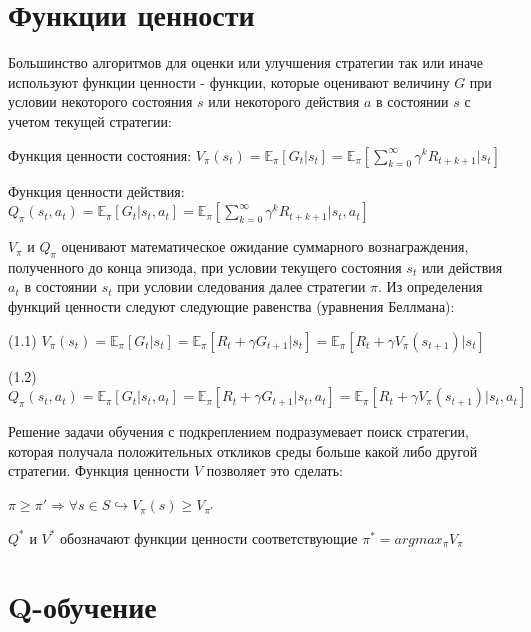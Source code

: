 \documentclass{mipt-thesis-bs}
\begin{document}
\section{Функции ценности}

Большинство алгоритмов для оценки или улучшения стратегии так или иначе используют функции ценности - функции, которые оценивают величину $G$ при условии некоторого состояния $s$ или некоторого действия $a$ в состоянии $s$ с учетом текущей стратегии:

Функция ценности состояния: $V_{\pi}(s_t) = \mathbb{E}_{\pi}[G_{t} | s_t]=\mathbb{E}_{\pi}[\sum_{k=0}^{\infty} \gamma^{k} R_{t+k+1} | s_t]$ 
 
Функция ценности действия: $Q_{\pi}(s_t, a_t) = \mathbb{E}_{\pi}[G_{t} | s_{t}, a_{t}]=\mathbb{E}_{\pi}[\sum_{k=0}^{\infty} \gamma^{k} R_{t+k+1} | s_{t}, a_{t}]$

$V_\pi$ и $Q_\pi$ оценивают математическое ожидание суммарного вознаграждения, полученного до конца эпизода, при условии текущего состояния $s_t$ или действия $a_t$ в состоянии $s_t$ при условии следования далее стратегии $\pi$. Из определения функций ценности следуют следующие равенства (уравнения Беллмана):
\begin{center}
(1.1) $V_{\pi}(s_t) = \mathbb{E}_{\pi}[G_t | s_t]=\mathbb{E}_{\pi}[R_{t} + \gamma G_{t+1}| s_t] = \mathbb{E}_{\pi}[R_{t} + \gamma V_{\pi}(s_{t+1})| s_t]$ 

(1.2) $Q_{\pi}(s_t, a_t) = \mathbb{E}_{\pi}[G_{t} | s_t, a_t]=\mathbb{E}_{\pi}[R_{t} + \gamma G_{t+1}| s_t, a_t] = \mathbb{E}_{\pi}[R_{t} + \gamma V_{\pi}(s_{t+1})| s_t, a_t]$
\end{center}

Решение задачи обучения с подкреплением подразумевает поиск стратегии, которая получала положительных откликов среды больше какой либо другой стратегии. Функция ценности $V$ позволяет это сделать:

\begin{center}
    $\pi \geq \pi' \Rightarrow \forall s \in S \hookrightarrow V_\pi(s) \geq V_{\pi'}$
\end{center}

$Q^*$ и $V^*$ обозначают функции ценности соответствующие $\pi^*= argmax_{\pi} V_\pi$

\section{Q-обучение}
\end{document}

